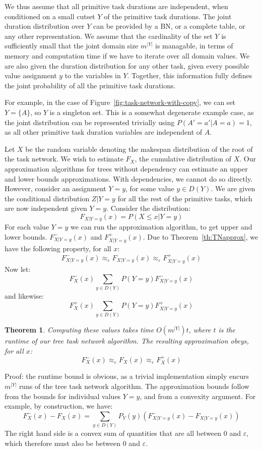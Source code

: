 \documentclass{article}
\newtheorem{theorem}{Theorem}
\begin{document}
We thus assume that all primitive task durations are independent, when conditioned on
a small cutset $Y$ of the primitive task durations. The joint duration distribution over $Y$
can be provided by a BN, or a complete table, or any other representation. We assume
that the cardinality of the set $Y$ is sufficiently small that the joint domain
size $m^{|Y|}$ is managable, in terms of memory and computation time if we have to
iterate over all domain values. We are also given the duration distribution for any
other task, given every possible value assignment $y$ to the variables in $Y$.
Together, this information fully defines the joint probability of all the 
primitive task durations. 

For example, in the case of Figure~\ref{fig:task-network-with-copy}, we can set $Y=\{ A\}$, so $Y$ is a singleton set.
This is a somewhat degenerate example case, as
the joint distribution can be represented trivially using $P(A'=a'|A=a)=1$,
as  all other primitive task duration variables are independent of $A$.

Let $X$ be the random variable denoting the makespan distribution of the
root of the task network. We wish to estimate $F_X$, the cumulative distribution of $X$.
Our approximation algorithms for trees without dependency can estimate an
upper and lower bounds approximations. With dependencies, we cannot do so directly.
However, consider an assignment $Y=y$, for some value $y\in D(Y)$. We are given the conditional
distribution $Z|Y=y$ for all the rest of the primitive tasks, which are now
independent given $Y=y$. Consider the distribution:
\[
F_{X|Y=y}(x) = P(X\leq x| Y=y)
\]
For each value $Y=y$ we can run the approximation algorithm, to get upper and lower bounds.
$F^-_{X|Y=y}(x)$ and  $F^+_{X|Y=y}(x)$. Due to Theorem~\ref{th:TNapprox}, we have
the following property, for all $x$:
\[
F^-_{X|Y=y}(x) \approx _\varepsilon F_{X|Y=y}(x) \approx _\varepsilon F^+_{X|Y=y}(x)
\]
Now let:
\[
F^-_{X}(x) \sum_{y\in D(Y)} P(Y=y) F^-_{X|Y=y}(x)
\]
and likewise:
\[
F^+_{X}(x) \sum_{y\in D(Y)} P(Y=y) F^+_{X|Y=y}(x)
\]

\begin{theorem}
Computing these values takes time $O(m^|Y|)t$, where $t$ is the runtime
of our tree task network algorithm. The resulting approximation obeys, for all $x$:
\[
F^-_{X}(x) \approx _\varepsilon F_{X}(x) \approx _\varepsilon F^+_{X}(x)
\]
\end{theorem}

Proof: the runtime bound is obvious, as a trivial implementation simply encurs $m^{|Y|}$
runs of the tree task network algorithm. The approximation bounds follow
from the bounds for individual values $Y=y$, and from a convexity argument.
For example, by construction, we have:
\[
F^-_{X}(x) -  F_{X}(x) =  \sum_{y\in D(Y)} P_{Y}(y)(F^-_{X|Y=y}(x) - F_{X|Y=y}(x))
\]
The right hand side is a convex sum of quantities that are all between 0 and $\varepsilon$, which therefore
must also be between 0 and $\varepsilon$.
\end{document}
